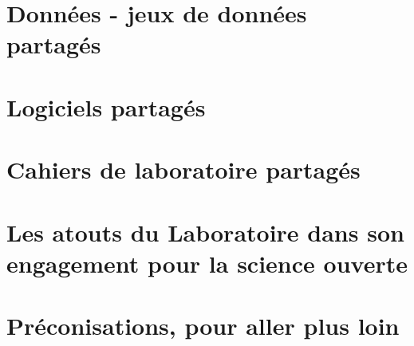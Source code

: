 \documentclass[french, 11pt]{dibiso/biso}
\begin{document}






\pagebreak

\section{Données - jeux de données partagés}







\section{Logiciels partagés}







\section{Cahiers de laboratoire partagés}







\pagebreak

\section{Les atouts du Laboratoire dans son engagement pour la science ouverte}








\section{Préconisations, pour aller plus loin}
\end{document}
